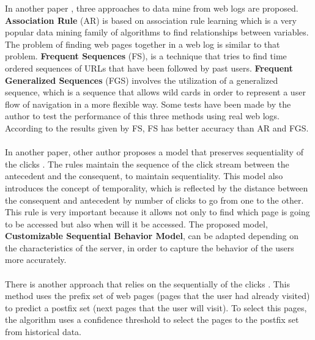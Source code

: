 In another paper \cite{Gery:2003:EWU:956699.956716}, three approaches to data
mine from web logs are proposed. \textbf{Association Rule} (AR) is based on
association rule learning which is a very popular data mining family of
algorithms to find relationships between variables. The problem of finding web
pages together in a web log is similar to that problem. \textbf{Frequent
Sequences} (FS), is a technique that tries to find time ordered sequences of
URLs that have been followed by past users. \textbf{Frequent Generalized
Sequences} (FGS) involves the utilization of a generalized sequence, which is a
sequence that allows wild cards in order to represent a user flow of navigation
in a more flexible way. Some tests have been made by the author
\cite{Gery:2003:EWU:956699.956716} to test the performance of this three methods
using real web logs. According to the results given by FS, FS has better
accuracy than AR and FGS.

\paragraph{}

In another paper, other author proposes a model that preserves sequentiality of
the clicks \cite{Frias-Martinez2003}. The rules maintain the sequence of the
click stream between the antecedent and the consequent, to maintain
sequentiality. This model also introduces the concept of temporality, which is
reflected by the distance between the consequent and antecedent by number of
clicks to go from one to the other. This rule is very important because it
allows not only to find which page is  going to be accessed but also when will
it be accessed. The proposed model, \textbf{Customizable Sequential Behavior
Model}, can be adapted depending on the characteristics of the server, in order
to capture the behavior of the users more accurately.

\paragraph{}

There is another approach that relies on the sequentially of the clicks
\cite{Jan:2007:WUB:1353862.1353874}. This method uses the prefix set of web
pages (pages that the user had already visited) to predict a postfix set (next
pages that the user will visit). To select this pages, the algorithm uses a
confidence threshold to select the pages to the postfix set from historical
data.


